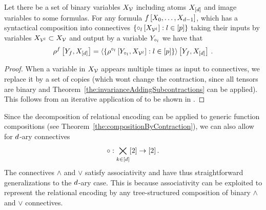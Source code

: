 \begin{theorem}\label{the:compositionByContraction}
	Let there be a set of binary variables $X_{\mathcal{V}}$ including atoms $X_{[d]}$ and image variables to some formulas.
	For any formula $f\left[X_{0},\ldots,X_{d-1}\right]$, which has a syntactical composition into connectives $\{\circ_{l}\left[X_{\mathcal{V}^{l}}\right] : l\in[p]\}$ taking their inputs by variables $X_{\mathcal{V}^{l}}\subset X_{\mathcal{V}}$ and output by a variable $Y_{\circ_{l}}$
	we have that
	\begin{align*}
		\rho^{f}\left[Y_{f},X_{[d]}\right] =
		\left\langle \left\{
		\rho^{\circ_{l}}\left[Y_{\circ_{l}},X_{\mathcal{V}^{l}}\right] : l\in[p]
		\right\} \right\rangle \left[ Y_{f},X_{[d]} \right] \, . 
	\end{align*}
\end{theorem}
\begin{proof}
	When a variable in $X_{\mathcal{V}}$ appears multiple times as input to connectives, we replace it by a set of copies (which wont change the contraction, since all tensors are binary and Theorem~\ref{the:invarianceAddingSubcontractions} can be applied).
	This follows from an iterative application of  to be shown in .
\end{proof}

\begin{remark}\label{rem:naryConnectives}
	Since the decomposition of relational encoding can be applied to generic function compositions (see Theorem~\ref{the:compositionByContraction}), we can also allow for $d$-ary connectives
		\[ \circ : \bigtimes_{k\in[d]} [2] \rightarrow [2] \, . \]
	The connectives $\land$ and $\lor$ satisfy associativity and have thus straightforward generalizations to the $d$-ary case.
	This is because associativity can be exploited to represent the relational encoding by any tree-structured composition of binary $\land$ and $\lor$ connectives.
\end{remark}


